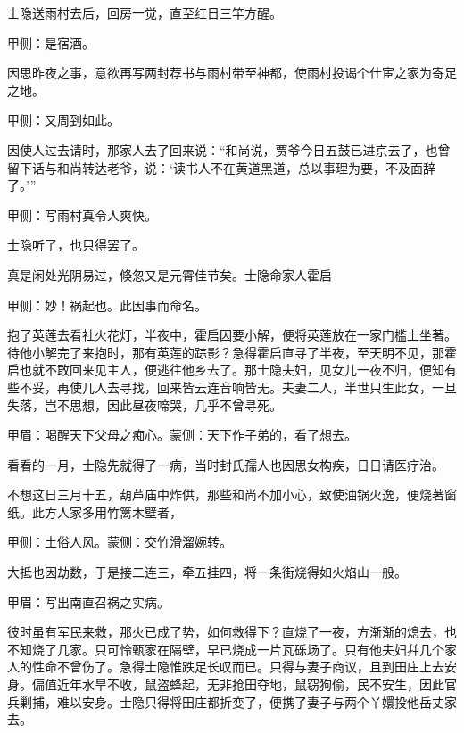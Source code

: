 \begin{parag}
    士隐送雨村去后，回房一觉，直至红日三竿方醒。\begin{note}甲侧：是宿酒。\end{note}因思昨夜之事，意欲再写两封荐书与雨村带至神都，使雨村投谒个仕宦之家为寄足之地。\begin{note}甲侧：又周到如此。\end{note}因使人过去请时，那家人去了回来说：“和尚说，贾爷今日五鼓已进京去了，也曾留下话与和尚转达老爷，说：‘读书人不在黄道黑道，总以事理为要，不及面辞了。’”\begin{note}甲侧：写雨村真令人爽快。\end{note}士隐听了，也只得罢了。
\end{parag}


\begin{parag}
    真是闲处光阴易过，倏忽又是元霄佳节矣。士隐命家人霍启\begin{note}甲侧：妙！祸起也。此因事而命名。\end{note}抱了英莲去看社火花灯，半夜中，霍启因要小解，便将英莲放在一家门槛上坐著。待他小解完了来抱时，那有英莲的踪影？急得霍启直寻了半夜，至天明不见，那霍启也就不敢回来见主人，便逃往他乡去了。那士隐夫妇，见女儿一夜不归，便知有些不妥，再使几人去寻找，回来皆云连音响皆无。夫妻二人，半世只生此女，一旦失落，岂不思想，因此昼夜啼哭，几乎不曾寻死。\begin{note}甲眉：喝醒天下父母之痴心。蒙侧：天下作子弟的，看了想去。\end{note}看看的一月，士隐先就得了一病，当时封氏孺人也因思女构疾，日日请医疗治。
\end{parag}


\begin{parag}
    不想这日三月十五，葫芦庙中炸供，那些和尚不加小心，致使油锅火逸，便烧著窗纸。此方人家多用竹篱木壁者，\begin{note}甲侧：土俗人风。蒙侧：交竹滑溜婉转。\end{note}大抵也因劫数，于是接二连三，牵五挂四，将一条街烧得如火焰山一般。\begin{note}甲眉：写出南直召祸之实病。\end{note}彼时虽有军民来救，那火已成了势，如何救得下？直烧了一夜，方渐渐的熄去，也不知烧了几家。只可怜甄家在隔壁，早已烧成一片瓦砾场了。只有他夫妇幷几个家人的性命不曾伤了。急得士隐惟跌足长叹而已。只得与妻子商议，且到田庄上去安身。偏值近年水旱不收，鼠盗蜂起，无非抢田夺地，鼠窃狗偷，民不安生，因此官兵剿捕，难以安身。士隐只得将田庄都折变了，便携了妻子与两个丫嬛投他岳丈家去。
\end{parag}


